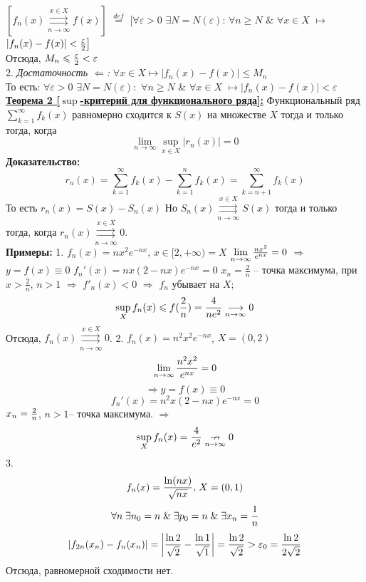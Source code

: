\documentclass[a4paper,12pt]{article} %
\renewcommand {\geq}{\geqslant}
\renewcommand {\leq}{\leqslant}
\begin{document}
$[f_n(x) \overset{x \in X}{\underset{n \rightarrow \infty}{\rightrightarrows}} f(x)]$ $\stackrel{def}{=}$ $\big[\forall \varepsilon > 0 $  $\exists N = N(\varepsilon)$: $\forall n \geq N$  $\&$  $\forall x \in X$ $\longmapsto$ $|f_n(x) -f(x)| < {\varepsilon \over 2} \big]$
\\[5 mm]
Отсюда, $M_n \leq {\varepsilon \over 2 } < \varepsilon$
\\[ 5 mm]
2. \textit{Достаточность $\Leftarrow$:} \newline
\hspace*{5mm}$\forall x \in X \longmapsto |f_n(x)-f(x)|\leq M_n$ 
\\[ 5 mm]
То есть: \newline
\hspace*{20mm}$\forall \varepsilon > 0$  $\exists N = N(\varepsilon):$  $\forall n \geq N$ $\&$ $\forall x \in X$ $\longmapsto |f_n(x)-f(x)| < \varepsilon$ \newline
\underline{\textbf{Теорема 2 [$\sup$-критерий для функционального ряда]:}}\newline 
Функциональный ряд $\sum\limits_{k = 1}^{\infty}  f_k(x)$ равномерно сходится к $S(x)$ на множестве $X$ тогда и только тогда, когда $$\lim\limits_{n \rightarrow \infty} \sup_{x \in X} |r_n(x)| = 0$$
\textbf{Доказательство:} 
$$r_n(x) = \sum\limits_{k = 1}^{\infty}  f_k(x) -  \sum\limits_{k = 1}^{n}  f_k(x)= \sum\limits_{k = n+1}^{\infty}  f_k(x)$$ \newline
То есть $r_n(x)=S(x)-S_n(x)$ \newline
Но $S_n(x) \overset{x \in X}{\underset{n \rightarrow \infty}{\rightrightarrows}} S(x)$ тогда и только тогда, когда $r_n(x) \overset{x \in X}{\underset{n \rightarrow \infty}{\rightrightarrows}} 0$.\\
\textbf{Примеры:}
1. $f_n(x) = nx^2e^{-nx}$, $x \in [2, +\infty) = X$
$\lim\limits_{n \rightarrow \infty}{nx^2 \over e^{nx}} = 0$ $\Rightarrow$ $y=f(x) \equiv 0$
$f_n'(x) = nx(2-nx)e^{-nx} = 0$
\hspace*{5mm}$x_n = {\frac{2}{n}}$ -- точка максимума, при $x > {\frac{2}{n}}$, $n>1$ $\Rightarrow$ $f'_n(x) < 0$ $\Rightarrow$ $f_n$ убывает на $X$;
$$\sup_{X}f_n(x) \leq f({2\over n}) = {4\over ne^2} \underset{n \rightarrow \infty}{\longrightarrow} 0 $$
Отсюда, $f_n(x) \overset{x \in X}{\underset{n \rightarrow \infty}{\rightrightarrows}} 0$.
2. $f_n(x) = n^2x^2e^{-nx}$, $X = (0,2)$
$$\lim\limits_{n \rightarrow \infty}{n^2x^2 \over e^{nx}} = 0$$ $$\Rightarrow y=f(x) \equiv 0$$
$$f_n'(x) = n^2x(2-nx)e^{-nx} = 0$$
\hspace*{5mm}$x_n = { 2 \over n}$,  $n>1$-- точка максимума. $\Rightarrow$
$$\sup_{X}f_n(x) = {4\over e^2} \underset{n \rightarrow \infty}{\nrightarrow} 0 $$
3. $$f_n(x) = {{\ln(nx)} \over {\sqrt{nx}}} \text{, } X = (0,1)$$
$$\forall n \; \exists n_0 = n \; \& \; \exists p_0 = n \; \& \; \exists x_n = {1 \over n}$$
$$|f_{2n}(x_n) - f_n(x_n)| = \left| {\ln{2}\over{\sqrt{2}}} - {\ln{1}\over{\sqrt{1}}} \right| = {\ln{2}\over{\sqrt{2}}} > \varepsilon_0 = {\ln{2}\over{2\sqrt{2}}}$$
Отсюда, равномерной сходимости нет.
\end{document}
